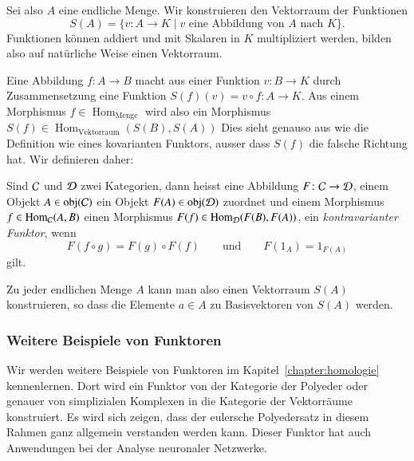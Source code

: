 Sei also $A$ eine endliche Menge.
Wir konstruieren den Vektorraum der Funktionen
\[
S(A) = \{v\colon A\to K\;|\;\text{$v$ eine Abbildung von $A$ nach $K$}\}.
\]
Funktionen können addiert und mit Skalaren in $K$ multipliziert werden,
bilden also auf natürliche Weise einen Vektorraum.

Eine Abbildung $f\colon A\to B$ macht aus einer Funktion $v\colon B\to K$
durch Zusammensetzung eine Funktion $S(f)(v)=v\circ f\colon A\to K$.
Aus einem Morphismus $f\in\operatorname{Hom}_{\text{Menge}}$ wird also 
ein Morphismus
$S(f)\in\operatorname{Hom}_{\text{Vektorraum}}(S(B),S(A))$
Dies sieht genauso aus wie die Definition wie eines kovarianten Funktors,
ausser dass $S(f)$ die falsche Richtung hat.
Wir definieren daher:

\begin{definition}
Sind $\cal C$ und $\cal D$ zwei Kategorien, dann heisst eine Abbildung
$F\colon\cal C\to \cal D$, einem Objekt $A\in \operatorname{obj}(\cal C)$
ein Objekt $F(A)\in\operatorname{obj}(\cal D)$ zuordnet und einem
Morphismus $f\in\operatorname{Hom}_{\cal C}(A,B)$ einen Morphismus
$F(f)\in\operatorname{Hom}_{\cal D}(F(B),F(A))$, ein
{\em kontravarianter Funktor},
wenn
\[
F(f\circ g)=F(g)\circ F(f)
\qquad\text{und}\qquad
F(1_A)=1_{F(A)}
\]
gilt.
\end{definition}

Zu jeder endlichen Menge $A$ kann man also einen Vektorraum $S(A)$
konstruieren, so dass die Elemente $a\in A$ zu Basisvektoren von $S(A)$
werden.

\subsubsection{Weitere Beispiele von Funktoren}
Wir werden weitere Beispiele von Funktoren im Kapitel~\ref{chapter:homologie}
kennenlernen.
Dort wird ein Funktor von der Kategorie der Polyeder oder
genauer von simplizialen Komplexen in die Kategorie der Vektorräume 
konstruiert.
Es wird sich zeigen, dass der eulersche Polyedersatz in diesem Rahmen
ganz allgemein verstanden werden kann.
Dieser Funktor hat auch Anwendungen bei der Analyse neuronaler Netzwerke.

